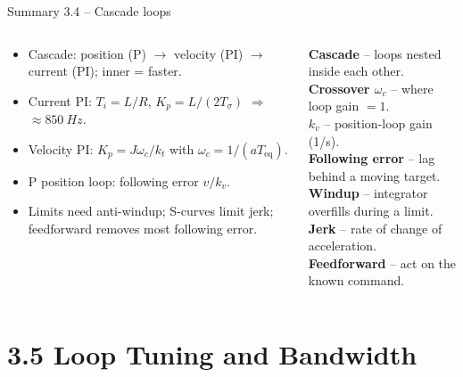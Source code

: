 \documentclass[aspectratio=169,10pt]{beamer}
\begin{document}
\begin{frame}{Summary 3.4 -- Cascade loops}
\begin{columns}[T,onlytextwidth]
\begin{keybox}
\small
\begin{itemize}
\item Cascade: position (P) $\to$ velocity (PI) $\to$ current (PI); inner = faster.
\item Current PI: $T_i=L/R$, $K_p=L/(2T_\sigma)$ $\Rightarrow$ $\approx\SI{850}{Hz}$.
\item Velocity PI: $K_p=J\omega_c/k_t$ with $\omega_c=1/(aT_\text{eq})$.
\item P position loop: following error $v/k_v$.
\item Limits need anti-windup; S-curves limit jerk; feedforward removes most following error.
\end{itemize}
\end{keybox}
\begin{defbox}
\small
\textbf{Cascade} -- loops nested inside each other.\\
\textbf{Crossover $\omega_c$} -- where loop gain $=1$.\\
\textbf{$k_v$} -- position-loop gain (1/s).\\
\textbf{Following error} -- lag behind a moving target.\\
\textbf{Windup} -- integrator overfills during a limit.\\
\textbf{Jerk} -- rate of change of acceleration.\\
\textbf{Feedforward} -- act on the known command.
\end{defbox}
\end{columns}
\end{frame}

\section{3.5 Loop Tuning and Bandwidth}
\end{document}
